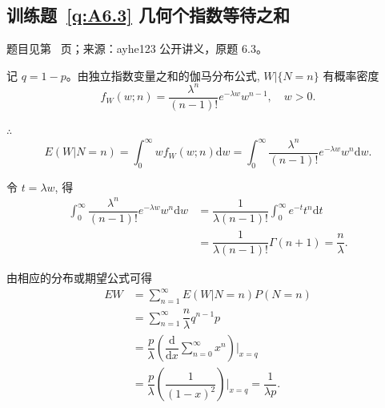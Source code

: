\subsection*{训练题~\ref{q:A6.3} 几何个指数等待之和}\label{a:A6.3}{\small 题目见第~\pageref{q:A6.3} 页；来源：ayhe123 公开讲义，原题 6.3。}
\begin{solve}
    记 $q=1-p$。由独立指数变量之和的伽马分布公式, $W|\{N=n\}$ 有概率密度
    \[f_W(w;n)=\dfrac{\lambda^n}{(n-1)!}e^{-\lambda w}w^{n-1},\quad w>0.\]

    $\therefore$
    \[E(W|N=n)=\int_0^\infty wf_W(w;n)\mathrm{d}w=\int_0^\infty\dfrac{\lambda^n}{(n-1)!}e^{-\lambda w}w^n\mathrm{d}w.\]

    令 $t=\lambda w$, 得
    \begin{align*}
        \int_0^\infty\dfrac{\lambda^n}{(n-1)!}e^{-\lambda w}w^n\mathrm{d}w & =\dfrac{1}{\lambda(n-1)!}\int_0^\infty e^{-t}t^n\mathrm{d}t \\
        & =\dfrac{1}{\lambda(n-1)!}\Gamma(n+1)=\dfrac{n}{\lambda}.
    \end{align*}

    由相应的分布或期望公式可得
    \begin{align*}
        EW & =\sum\limits_{n=1}^\infty E(W|N=n)P(N=n) \\
        & =\sum\limits_{n=1}^\infty\dfrac{n}{\lambda}q^{n-1}p \\
        & =\dfrac{p}{\lambda}\left(\dfrac{\mathrm{d}}{\mathrm{d}x}\sum\limits_{n=0}^\infty x^n\right)\Bigg|_{x=q} \\
        & =\dfrac{p}{\lambda}\left(\dfrac{1}{(1-x)^2}\right)\Bigg|_{x=q}=\dfrac{1}{\lambda p}.
    \end{align*}
\end{solve}

